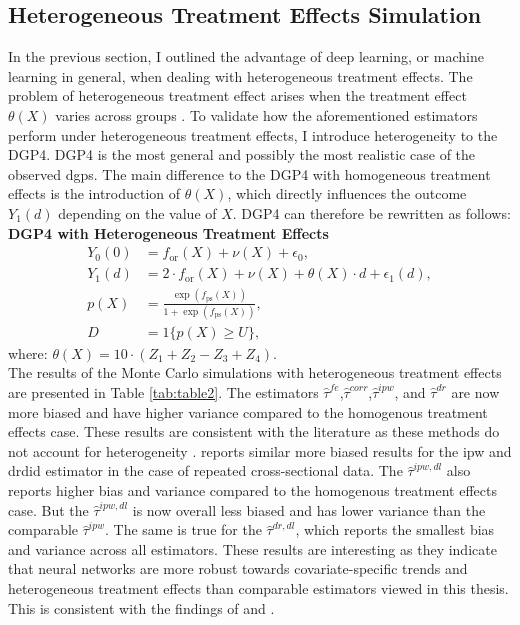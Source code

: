 \subsection{Heterogeneous Treatment Effects Simulation}
In the previous section, I outlined the advantage of deep learning, or machine learning in general, when dealing with heterogeneous treatment effects.
The problem of heterogeneous treatment effect arises when the treatment effect $\theta(X)$ varies across groups \citep{hansen2022econometrics}.
To validate how the aforementioned estimators perform under heterogeneous treatment effects, I introduce heterogeneity to the DGP4.
DGP4 is the most general and possibly the most realistic case of the observed \ac{dgp}s.
The main difference to the DGP4 with homogeneous treatment effects is the introduction of $\theta(X)$, which directly influences the outcome $Y_1(d)$ depending on the value of $X$.
DGP4 can therefore be rewritten as follows:
\\
\textbf{DGP4 with Heterogeneous Treatment Effects}
\begin{align*}
    Y_0(0) &= f_{\text{or}}(X) + \nu(X) + \epsilon_0, \\
    Y_1(d) &= 2 \cdot f_{\text{or}}(X) + \nu(X) + \theta(X) \cdot d + \epsilon_1(d), \\
    p(X) &= \frac{\exp \left( f_{\text{ps}}(X) \right)}{1 + \exp \left( f_{\text{ps}}(X) \right)}, \\
    D &= 1\{ p(X) \geq U \},
\end{align*}
where: $\theta(X) = 10 \cdot (Z_1 + Z_2 - Z_3 + Z_4)$.\\

The results of the Monte Carlo simulations with heterogeneous treatment effects are presented in Table \ref{tab:table2}.
The estimators $\hat{\tau}^{fe}$,$\hat{\tau}^{corr}$,$\hat{\tau}^{ipw}$, and $\hat{\tau}^{dr}$ are now more biased and have higher variance compared to the homogenous treatment effects case.
These results are consistent with the literature as these methods do not account for heterogeneity \citep{hansen2022econometrics}.
\citet{manfeDifferenceInDifferenceDesignRepeated} reports similar more biased results for the \ac{ipw} and \ac{drdid} estimator in the case of repeated cross-sectional data.
The $\hat{\tau}^{ipw,dl}$ also reports higher bias and variance compared to the homogenous treatment effects case.
But the $\hat{\tau}^{ipw,dl}$ is now overall less biased and has lower variance than the comparable $\hat{\tau}^{ipw}$.
The same is true for the $\hat{\tau}^{dr,dl}$, which reports the smallest bias and variance across all estimators.
These results are interesting as they indicate that neural networks are more robust towards covariate-specific trends and heterogeneous treatment effects than comparable estimators viewed in this thesis.
This is consistent with the findings of \citet{farrellDeepNeuralNetworks2021} and \citet{chernozhukovDoubleDebiasedMachine2018}.

